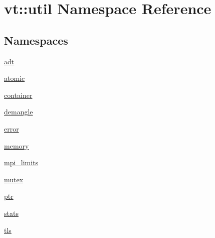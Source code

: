 \hypertarget{namespacevt_1_1util}{}\section{vt\+:\+:util Namespace Reference}
\label{namespacevt_1_1util}
\subsection*{Namespaces}
\begin{DoxyCompactItemize}
\item 
 \hyperlink{namespacevt_1_1util_1_1adt}{adt}
\item 
 \hyperlink{namespacevt_1_1util_1_1atomic}{atomic}
\item 
 \hyperlink{namespacevt_1_1util_1_1container}{container}
\item 
 \hyperlink{namespacevt_1_1util_1_1demangle}{demangle}
\item 
 \hyperlink{namespacevt_1_1util_1_1error}{error}
\item 
 \hyperlink{namespacevt_1_1util_1_1memory}{memory}
\item 
 \hyperlink{namespacevt_1_1util_1_1mpi__limits}{mpi\+\_\+limits}
\item 
 \hyperlink{namespacevt_1_1util_1_1mutex}{mutex}
\item 
 \hyperlink{namespacevt_1_1util_1_1ptr}{ptr}
\item 
 \hyperlink{namespacevt_1_1util_1_1stats}{stats}
\item 
 \hyperlink{namespacevt_1_1util_1_1tls}{tls}
\end{DoxyCompactItemize}
